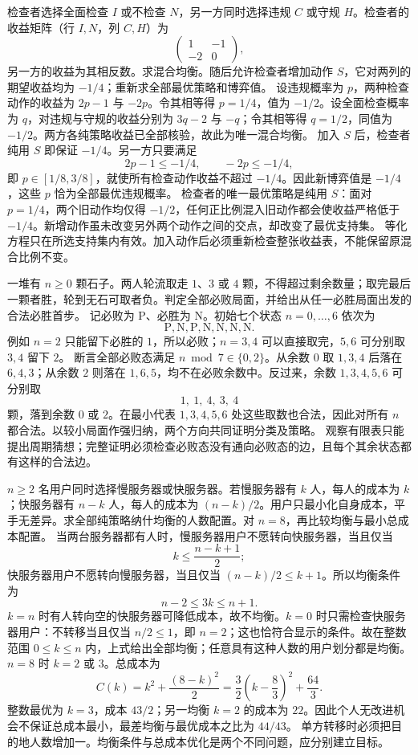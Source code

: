 检查者选择全面检查 $I$ 或不检查 $N$，另一方同时选择违规 $C$ 或守规 $H$。检查者的收益矩阵（行 $I,N$，列 $C,H$）为
\[
 \begin{pmatrix}1&-1\\-2&0\end{pmatrix},
\]
另一方的收益为其相反数。求混合均衡。随后允许检查者增加动作 $S$，它对两列的期望收益均为 $-1/4$；重新求全部最优策略和博弈值。
\solution 设违规概率为 $p$，两种检查动作的收益为 $2p-1$ 与 $-2p$。令其相等得 $p=1/4$，值为 $-1/2$。设全面检查概率为 $q$，对违规与守规的收益分别为 $3q-2$ 与 $-q$；令其相等得 $q=1/2$，同值为 $-1/2$。两方各纯策略收益已全部核验，故此为唯一混合均衡。
加入 $S$ 后，检查者纯用 $S$ 即保证 $-1/4$。另一方只要满足
\[
 2p-1\le-1/4,\qquad -2p\le-1/4,
\]
即 $p\in[1/8,3/8]$，就使所有检查动作收益不超过 $-1/4$。因此新博弈值是 $-1/4$，这些 $p$ 恰为全部最优违规概率。
检查者的唯一最优策略是纯用 $S$：面对 $p=1/4$，两个旧动作均仅得 $-1/2$，任何正比例混入旧动作都会使收益严格低于 $-1/4$。新增动作虽未改变另外两个动作之间的交点，却改变了最优支持集。
\insight 等化方程只在所选支持集内有效。加入动作后必须重新检查整张收益表，不能保留原混合比例不变。

一堆有 $n\ge0$ 颗石子。两人轮流取走 $1$、$3$ 或 $4$ 颗，不得超过剩余数量；取完最后一颗者胜，轮到无石可取者负。判定全部必败局面，并给出从任一必胜局面出发的合法必胜首步。
\solution 记必败为 P、必胜为 N。初始七个状态 $n=0,\ldots,6$ 依次为
\[
 \mathrm{P,N,P,N,N,N,N}.
\]
例如 $n=2$ 只能留下必胜的 $1$，所以必败；$n=3,4$ 可以直接取完，$5,6$ 可分别取 $3,4$ 留下 $2$。
断言全部必败态满足 $n\bmod7\in\{0,2\}$。从余数 $0$ 取 $1,3,4$ 后落在 $6,4,3$；从余数 $2$ 则落在 $1,6,5$，均不在必败余数中。反过来，余数 $1,3,4,5,6$ 可分别取
\[
 1,\ 1,\ 4,\ 3,\ 4
\]
颗，落到余数 $0$ 或 $2$。在最小代表 $1,3,4,5,6$ 处这些取数也合法，因此对所有 $n$ 都合法。以较小局面作强归纳，两个方向共同证明分类及策略。
\insight 观察有限表只能提出周期猜想；完整证明必须检查必败态没有通向必败态的边，且每个其余状态都有这样的合法边。

$n\ge2$ 名用户同时选择慢服务器或快服务器。若慢服务器有 $k$ 人，每人的成本为 $k$；快服务器有 $n-k$ 人，每人的成本为 $(n-k)/2$。用户只最小化自身成本，平手无差异。求全部纯策略纳什均衡的人数配置。对 $n=8$，再比较均衡与最小总成本配置。
\solution 当两台服务器都有人时，慢服务器用户不愿转向快服务器，当且仅当
\[
 k\le\frac{n-k+1}{2};
\]
快服务器用户不愿转向慢服务器，当且仅当 $(n-k)/2\le k+1$。所以均衡条件为
\[
 \boxed{n-2\le3k\le n+1}.
\]
$k=n$ 时有人转向空的快服务器可降低成本，故不均衡。$k=0$ 时只需检查快服务器用户：不转移当且仅当 $n/2\le1$，即 $n=2$；这也恰符合显示的条件。故在整数范围 $0\le k\le n$ 内，上式给出全部均衡；任意具有这种人数的用户划分都是均衡。
$n=8$ 时 $k=2$ 或 $3$。总成本为
\[
 C(k)=k^2+\frac{(8-k)^2}{2}
 =\frac32\left(k-\frac83\right)^2+\frac{64}{3}.
\]
整数最优为 $k=3$，成本 $43/2$；另一均衡 $k=2$ 的成本为 $22$。因此个人无改进机会不保证总成本最小，最差均衡与最优成本之比为 $44/43$。
\insight 单方转移时必须把目的地人数增加一。均衡条件与总成本优化是两个不同问题，应分别建立目标。

